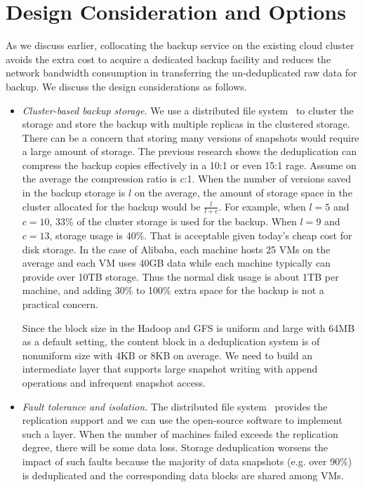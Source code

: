 \section{Design Consideration and Options}
\label{sect:options}

As we discuss earlier, collocating the backup service on the existing
cloud cluster avoids the extra cost to acquire a dedicated backup facility
and reduces the network bandwidth consumption in transferring the un-deduplicated
raw data for backup. 
We discuss the design considerations as follows. 

\begin{itemize}
\item {\em Cluster-based backup storage.}
We use a distributed file system~\cite{GFS2004,Hadoop}  to cluster
the storage  and store the backup with multiple replicas in the clustered storage.
There can be a concern that storing many versions  of snapshots would
require	a large amount of storage.
The previous research shows the deduplication can compress the backup copies 
effectively in a 10:1 or even 15:1 rage. Assume on the average the compression
ratio is $c$:1.  When the number of versions
saved in the backup storage is $l$  on the average, 
the amount of storage space in the cluster allocated  for the backup would be $\frac{l}{l+c}$.
For example, when $l=5$ and $c=10$, 33\% of the cluster storage is used for the backup.
When $l=9$ and $c=13$, storage usage is 40\%. 
That is acceptable given today's cheap cost for disk storage.
In the case of Alibaba, each machine hosts 25 VMs on the average and each VM uses 40GB data
while each machine typically can provide over 10TB storage.
Thus the normal disk usage  is about 1TB per machine, and adding 30\% to 100\% 
extra space for the backup is not a practical concern.

Since the block size in the Hadoop and GFS is uniform and large with 64MB as a default setting,
the content block in a deduplication system is of nonuniform size with 4KB or 8KB on average.
We need to build an intermediate layer that supports large snapshot writing with append operations
and infrequent snapshot access.

\item {\em Fault tolerance and isolation.}
The distributed file system~\cite{GoogleFS,Hadoop} provides the replication support
and we can use the open-source software to implement such a layer.
When the number of machines failed exceeds the replication degree, there will be
 some data loss.  Storage deduplication worsens the impact of such faults
because  the majority of data snapshots (e.g. over 90\%) is deduplicated
and the corresponding data blocks are shared among VMs.


\end{itemize}
